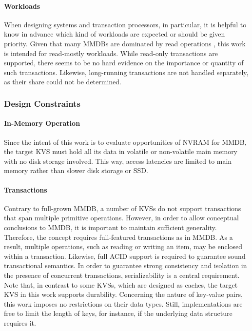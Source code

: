 \vfill

\paragraph{Workloads}

When designing systems and transaction processors, in particular, it is helpful
to know in advance which kind of workloads are expected or should be given
priority. Given that many \acp{MMDB} are dominated by read operations
\cite{andrei2017sap}, this work is intended for read-mostly workloads. While
read-only transactions are supported, there seems to be no hard evidence on the
importance or quantity of such transactions. Likewise, long-running transactions
are not handled separately, as their share could not be determined.

\subsubsection{Design Constraints}

\paragraph{In-Memory Operation}

Since the intent of this work is to evaluate opportunities of \ac{NVRAM} for
\ac{MMDB}, the target \ac{KVS} must hold all its data in volatile or
non-volatile main memory with no disk storage involved. This way, access
latencies are limited to main memory rather than slower disk storage or
\ac{SSD}.

\paragraph{Transactions}

Contrary to full-grown \ac{MMDB}, a number of \acp{KVS} do not support
transactions that span multiple primitive operations. However, in order to allow
conceptual conclusions to \ac{MMDB}, it is important to maintain sufficient
generality. Therefore, the concept requires full-featured transactions as in
\ac{MMDB}. As a result, multiple operations, such as reading or writing an item,
may be enclosed within a transaction. Likewise, full ACID support is required to
guarantee sound transactional semantics. In order to guarantee strong
consistency and isolation in the presence of concurrent transactions,
serializability is a central requirement. Note that, in contrast to some
\acp{KVS}, which are designed as caches, the target \ac{KVS} in this work
supports durability. Concerning the nature of key-value pairs, this work imposes
no restrictions on their data types. Still, implementations are free to limit
the length of keys, for instance, if the underlying data structure requires it.

